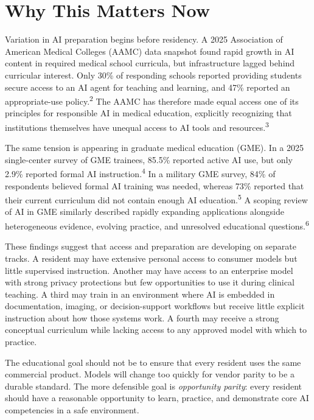 \documentclass[12pt]{article}
\begin{document}
\section*{Why This Matters Now}

Variation in AI preparation begins before residency. A 2025 Association of
American Medical Colleges (AAMC) data snapshot found rapid growth in AI content
in required medical school curricula, but infrastructure lagged behind
curricular interest. Only 30\% of responding schools reported providing
students secure access to an AI agent for teaching and learning, and 47\%
reported an appropriate-use policy.\textsuperscript{2} The AAMC has therefore
made equal access one of its principles for responsible AI in medical
education, explicitly recognizing that institutions themselves have unequal
access to AI tools and resources.\textsuperscript{3}

The same tension is appearing in graduate medical education (GME). In a 2025
single-center survey of GME trainees, 85.5\% reported active AI use, but only
2.9\% reported formal AI instruction.\textsuperscript{4} In a military GME
survey, 84\% of respondents believed formal AI training was needed, whereas
73\% reported that their current curriculum did not contain enough AI
education.\textsuperscript{5} A scoping review of AI in GME similarly described
rapidly expanding applications alongside heterogeneous evidence, evolving
practice, and unresolved educational questions.\textsuperscript{6}

These findings suggest that access and preparation are developing on separate
tracks. A resident may have extensive personal access to consumer models but
little supervised instruction. Another may have access to an enterprise model
with strong privacy protections but few opportunities to use it during
clinical teaching. A third may train in an environment where AI is embedded in
documentation, imaging, or decision-support workflows but receive little
explicit instruction about how those systems work. A fourth may receive a
strong conceptual curriculum while lacking access to any approved model with
which to practice.

The educational goal should not be to ensure that every resident uses the same
commercial product. Models will change too quickly for vendor parity to be a
durable standard. The more defensible goal is \emph{opportunity parity}: every
resident should have a reasonable opportunity to learn, practice, and
demonstrate core AI competencies in a safe environment.
\end{document}
